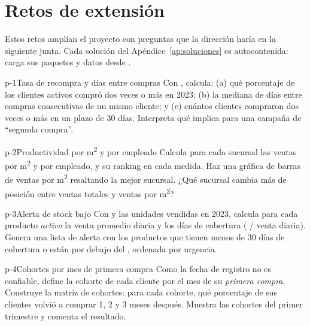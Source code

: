 \section{Retos de extensión}
\label{sec:m09-retos}

Estos retos amplían el proyecto con preguntas que la dirección haría en la
siguiente junta. Cada solución del Apéndice~\ref{ap:soluciones} es
autocontenida: carga sus paquetes y datos desde .

\begin{ejercicio}{p-1}{Tasa de recompra y días entre compras}
Con , calcula: (a) qué porcentaje de los clientes
activos compró dos veces o más en 2023; (b) la mediana de días entre
compras consecutivas de un mismo cliente; y (c) cuántos clientes
compraron dos veces o más en un plazo de 30 días. Interpreta qué implica
para una campaña de ``segunda compra''.
\end{ejercicio}

\begin{ejercicio}{p-2}{Productividad por m\textsuperscript{2} y por empleado}
Calcula para cada sucursal las ventas por m\textsuperscript{2} y por
empleado, y su ranking en cada medida. Haz una gráfica de barras de ventas
por m\textsuperscript{2} resaltando la mejor sucursal. ¿Qué sucursal cambia
más de posición entre ventas totales y ventas por m\textsuperscript{2}?
\end{ejercicio}

\begin{ejercicio}{p-3}{Alerta de stock bajo}
Con  y las unidades vendidas en 2023, calcula para
cada producto \emph{activo} la venta promedio diaria y los días de cobertura
( / venta diaria). Genera una lista de alerta con los
productos que tienen menos de 30 días de cobertura o están por debajo del
, ordenada por urgencia.
\end{ejercicio}

\begin{ejercicio}{p-4}{Cohortes por mes de primera compra}
Como la fecha de registro no es confiable, define la cohorte de cada cliente
por el mes de su \emph{primera compra}. Construye la matriz de cohortes: para
cada cohorte, qué porcentaje de sus clientes volvió a comprar 1, 2 y 3 meses
después. Muestra las cohortes del primer trimestre y comenta el resultado.
\end{ejercicio}

